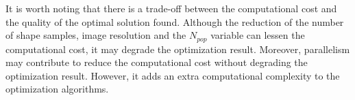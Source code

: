 It is worth noting that there is a trade-off between the computational cost and the quality of the optimal solution found. Although the reduction of the number of shape samples, image resolution and the $N_{pop}$ variable can lessen the computational cost, it may degrade the optimization result. Moreover, parallelism may contribute to reduce the computational cost without degrading the optimization result.  However, it adds an extra computational complexity to the optimization algorithms.
